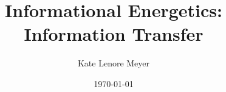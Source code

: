 \documentclass[aps,prd,twocolumn,showpacs,superscriptaddress,groupedaddress,nofootinbib,english,floatfix]{revtex4-2}
\begin{document}
\title{Informational Energetics: Information Transfer}

\author{Kate Lenore Meyer}

\date{\today}



\maketitle %








\clearpage










\end{document}
